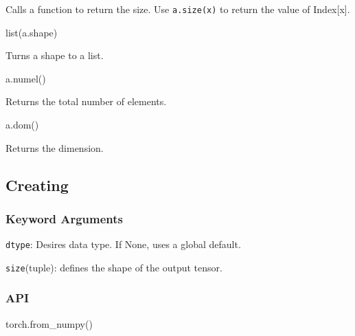 \documentclass[
]{article}
\newenvironment{Shaded}{}{}
\newcommand{\BuiltInTok}[1]{#1}
\newcommand{\NormalTok}[1]{#1}
\begin{document}
Calls a function to return the size. Use \texttt{a.size(x)} to return
the value of Index{[}x{]}.

\begin{Shaded}
\begin{Highlighting}[]
\BuiltInTok{list}\NormalTok{(a.shape)}
\end{Highlighting}
\end{Shaded}

Turns a shape to a list.

\begin{Shaded}
\begin{Highlighting}[]
\NormalTok{a.numel()}
\end{Highlighting}
\end{Shaded}

Returns the total number of elements.

\begin{Shaded}
\begin{Highlighting}[]
\NormalTok{a.dom()}
\end{Highlighting}
\end{Shaded}

Returns the dimension.

\hypertarget{header-n997}{%
\subsection{Creating}\label{header-n997}}

\hypertarget{header-n1076}{%
\subsubsection{Keyword Arguments}\label{header-n1076}}

\texttt{dtype}: Desires data type. If None, uses a global default.

\texttt{size}(tuple): defines the shape of the output tensor.

\hypertarget{header-n1089}{%
\subsubsection{\texorpdfstring{API }{API  }}\label{header-n1089}}

\begin{Shaded}
\begin{Highlighting}[]
\NormalTok{torch.from\_numpy()}
\end{Highlighting}
\end{Shaded}
\end{document}
